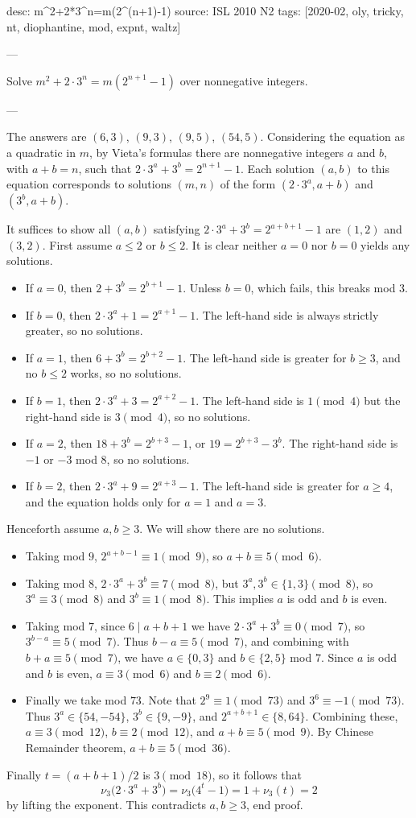 desc: m^2+2*3^n=m(2^(n+1)-1)
source: ISL 2010 N2
tags: [2020-02, oly, tricky, nt, diophantine, mod, expnt, waltz]

---

Solve $m^2+2\cdot3^n=m\left(2^{n+1}-1\right)$ over nonnegative integers.

---

The answers are $(6,3)$, $(9,3)$, $(9,5)$, $(54,5)$. Considering the equation as a quadratic in $m$, by Vieta's formulas there are nonnegative integers $a$ and $b$, with $a+b=n$, such that $2\cdot3^a+3^b=2^{n+1}-1$. Each solution $(a,b)$ to this equation corresponds to solutions $(m,n)$ of the form $(2\cdot3^a,a+b)$ and $(3^b,a+b)$.

It suffices to show all $(a,b)$ satisfying $2\cdot3^a+3^b=2^{a+b+1}-1$ are $(1,2)$ and $(3,2)$. First assume $a\le2$ or $b\le2$. It is clear neither $a=0$ nor $b=0$ yields any solutions.
\begin{itemize}
    \item If $a=0$, then $2+3^b=2^{b+1}-1$. Unless $b=0$, which fails, this breaks mod $3$.
    \item If $b=0$, then $2\cdot3^a+1=2^{a+1}-1$. The left-hand side is always strictly greater, so no solutions.
    \item If $a=1$, then $6+3^b=2^{b+2}-1$. The left-hand side is greater for $b\ge3$, and no $b\le2$ works, so no solutions.
    \item If $b=1$, then $2\cdot3^a+3=2^{a+2}-1$. The left-hand side is $1\pmod4$ but the right-hand side is $3\pmod4$, so no solutions.
    \item If $a=2$, then $18+3^b=2^{b+3}-1$, or $19=2^{b+3}-3^b$. The right-hand side is $-1$ or $-3$ mod $8$, so no solutions.
    \item If $b=2$, then $2\cdot3^a+9=2^{a+3}-1$. The left-hand side is greater for $a\ge4$, and the equation holds only for $a=1$ and $a=3$.
\end{itemize}
Henceforth assume $a,b\ge3$. We will show there are no solutions.
\begin{itemize}
    \item Taking mod $9$, $2^{a+b-1}\equiv1\pmod9$, so $a+b\equiv5\pmod6$.
    \item Taking mod $8$, $2\cdot3^a+3^b\equiv7\pmod8$, but $3^a,3^b\in\{1,3\}\pmod8$, so $3^a\equiv3\pmod8$ and $3^b\equiv1\pmod8$. This implies $a$ is odd and $b$ is even.
    \item Taking mod $7$, since $6\mid a+b+1$ we have $2\cdot3^a+3^b\equiv0\pmod7$, so $3^{b-a}\equiv5\pmod7$. Thus $b-a\equiv5\pmod7$, and combining with $b+a\equiv5\pmod7$, we have $a\in\{0,3\}$ and $b\in\{2,5\}$ mod $7$. Since $a$ is odd and $b$ is even, $a\equiv3\pmod6$ and $b\equiv2\pmod6$.
    \item Finally we take mod $73$. Note that $2^9\equiv1\pmod{73}$ and $3^6\equiv-1\pmod{73}$. Thus $3^a\in\{54,-54\}$, $3^b\in\{9,-9\}$, and $2^{a+b+1}\in\{8,64\}$. Combining these, $a\equiv3\pmod{12}$, $b\equiv2\pmod{12}$, and $a+b\equiv5\pmod9$. By Chinese Remainder theorem, $a+b\equiv5\pmod{36}$.
\end{itemize}
Finally $t=(a+b+1)/2$ is $3\pmod{18}$, so it follows that \[\nu_3\big(2\cdot3^a+3^b\big)=\nu_3\big(4^t-1\big)=1+\nu_3(t)=2\]
by lifting the exponent. This contradicts $a,b\ge3$, end proof.
